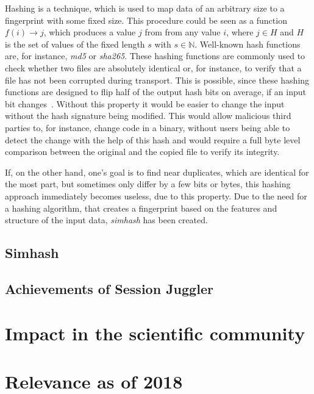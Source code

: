 \documentclass[12pt,twocolumn,a4paper,DIV=calc]{scrartcl}
\begin{document}
Hashing is a technique, which is used to map data of an arbitrary size to a fingerprint with some fixed size.
This procedure could be seen as a function  $f(i) \rightarrow j$, which produces a value $j$ from from any value $i$, where $j \in H$ and $H$ is the set of values of the fixed length $s$ with $s \in \mathbb{N}$.
Well-known hash functions are, for instance, \emph{md5} or \emph{sha265}.
These hashing functions are commonly used to check whether two files are absolutely identical or, for instance, to verify that a file has not been corrupted during transport.
This is possible, since these hashing functions are designed to flip half of the output hash bits on average, if an input bit changes~\cite{book:hashing}.
Without this property it would be easier to change the input without the hash signature being modified.
This would allow malicious third parties to, for instance, change code in a binary, without users being able to detect the change with the help of this hash and would require a full byte level comparison between the original and the copied file to verify its integrity.

If, on the other hand, one's goal is to find near duplicates, which are identical for the most part, but sometimes only differ by a few bits or bytes, this hashing approach immediately becomes useless, due to this property.
Due to the need for a hashing algorithm, that creates a fingerprint based on the features and structure of the input data, \emph{simhash} has been created.


\subsection{Simhash}

\cite{inproc:simhash}

\subsection{}



\subsection{Achievements of Session Juggler}


\section{Impact in the scientific community}


\section{Relevance as of 2018}


\printbibliography
\end{document}
